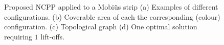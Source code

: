 \documentclass[conference]{IEEEtran}
\begin{document}
\begin{figure}[t]
\centering
{}
\caption{Proposed NCPP applied to a Mobi\"{u}s strip (a) Examples of different configurations. 
(b) Coverable area of each the corresponding (colour) configuration. 
(c) Topological graph (d) One optimal solution requiring $1$ lift-offs. }
\label{fig_mobius_exp}
\end{figure}
\end{document}
